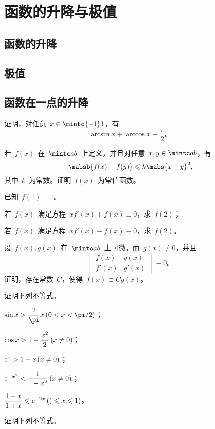 \section{函数的升降与极值}
\subsection{函数的升降}
\subsection{极值}
\subsection{函数在一点的升降}
\begin{exercise}
\item 证明，对任意~$x\in\mintc{-1}1$，有
\[
  \arcsin x+\arccos x\equiv\frac\pi2 。
\]
\item 若~$f(x)$~在~$\mintc ab$~上定义，并且对任意~$x,y\in\mintc ab$，有
\[
  \mabsb{f(x)-f(y)}\leq k\mabs{x-y}^2,
\]
其中~$k$~为常数。证明~$f(x)$~为常值函数。
\item 已知~$f(1)=1$。
\begin{exlist}
  \item 若~$f(x)$~满足方程~$xf'(x)+f(x)\equiv0$，求~$f(2)$；
  \item 若~$f(x)$~满足方程~$xf'(x)-f(x)\equiv0$，求~$f(2)$。
\end{exlist}
\item 设~$f(x),g(x)$~在~$\minto ab$~上可微，而~$g(x)\neq0$，并且
\[
  \begin{vmatrix}
    f(x)  & g(x) \\
    f'(x) & g'(x)
  \end{vmatrix}\equiv 0 。
\]
证明，存在常数~$C$，使得~$f(x)\equiv Cg(x)$。
\item 证明下列不等式。
\begin{exlistcols}
  \item $\sin x>\dfrac2\pi x\mcond{0<x<\sfrac\pi2}$；
  \item $\cos x>1-\dfrac{x^2}2\mcond{x\neq0}$；
  \item $\me^x>1+x\mcond{x\neq0}$；
  \item $\me^{-x^2}<\dfrac1{1+x^2}\mcond{x\neq0}$；
  \item $\dfrac{1-x}{1+x}\leq\me^{-2x}\mcond{)\leq x\leq 1}$。
\end{exlistcols}
\item 证明下列不等式。
\begin{exlistcols}

\end{exlistcols}
\end{exercise}

